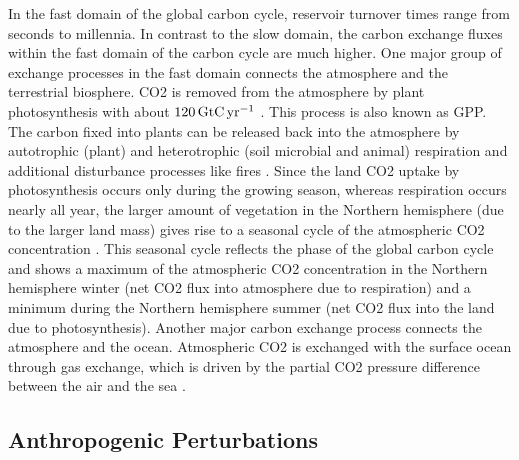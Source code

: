 In the fast domain of the global carbon cycle, reservoir turnover times range
from seconds to millennia. In contrast to the slow domain, the carbon exchange
fluxes within the fast domain of the carbon cycle are much higher. One major
group of exchange processes in the fast domain connects the atmosphere and the
terrestrial biosphere. \ac{CO2} is removed from the atmosphere by plant
photosynthesis with about $120 \unit{\GtCyr{}}$ \autocite{Ciais2013}. This
process is also known as \ac{GPP}. The carbon fixed into plants can be released
back into the atmosphere by autotrophic (plant) and heterotrophic (soil
microbial and animal) respiration and additional disturbance processes like
fires \autocite{Ciais2013}. Since the land \ac{CO2} uptake by photosynthesis
occurs only during the growing season, whereas respiration occurs nearly all
year, the larger amount of vegetation in the Northern hemisphere (due to the
larger land mass) gives rise to a seasonal cycle of the atmospheric \ac{CO2}
concentration \autocite{Keeling1995}. This seasonal cycle reflects the phase of
the global carbon cycle and shows a maximum of the atmospheric \ac{CO2}
concentration in the Northern hemisphere winter (net \ac{CO2} flux into
atmosphere due to respiration) and a minimum during the Northern hemisphere
summer (net \ac{CO2} flux into the land due to photosynthesis). Another major
carbon exchange process connects the atmosphere and the ocean. Atmospheric
\ac{CO2} is exchanged with the surface ocean through gas exchange, which is
driven by the partial \ac{CO2} pressure difference between the air and the sea
\autocite{Ciais2013}.


\subsection{Anthropogenic Perturbations}
\label{subsec:02:carbon_cycle_perturbations}

